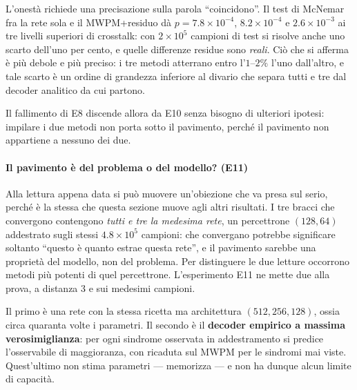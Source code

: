 L'onestà richiede una precisazione sulla parola ``coincidono''. Il test di McNemar fra la rete sola e il \ac{MWPM}+residuo dà $p = 7.8\times10^{-4}$, $8.2\times10^{-4}$ e $2.6\times10^{-3}$ ai tre livelli superiori di crosstalk: con $2\times10^{5}$ campioni di test si risolve anche uno scarto dell'uno per cento, e quelle differenze residue sono \emph{reali}. Ciò che si afferma è più debole e più preciso: i tre metodi atterrano entro l'$1$--$2\%$ l'uno dall'altro, e tale scarto è un ordine di grandezza inferiore al divario che separa tutti e tre dal decoder analitico da cui partono.

Il fallimento di E8 discende allora da E10 senza bisogno di ulteriori ipotesi: impilare i due metodi non porta sotto il pavimento, perché il pavimento non appartiene a nessuno dei due.

\paragraph{Il pavimento è del problema o del modello? (E11)}
Alla lettura appena data si può muovere un'obiezione che va presa sul serio, perché è la stessa che questa sezione muove agli altri risultati. I tre bracci che convergono contengono \emph{tutti e tre la medesima rete}, un percettrone $(128, 64)$ addestrato sugli stessi $4.8\times10^5$ campioni: che convergano potrebbe significare soltanto ``questo è quanto estrae questa rete'', e il pavimento sarebbe una proprietà del modello, non del problema. Per distinguere le due letture occorrono metodi più potenti di quel percettrone. L'esperimento E11 ne mette due alla prova, a distanza 3 e sui medesimi campioni.

Il primo è una rete con la stessa ricetta ma architettura $(512, 256, 128)$, ossia circa quaranta volte i parametri. Il secondo è il \textbf{decoder empirico a massima verosimiglianza}: per ogni sindrome osservata in addestramento si predice l'osservabile di maggioranza, con ricaduta sul \ac{MWPM} per le sindromi mai viste. Quest'ultimo non stima parametri --- memorizza --- e non ha dunque alcun limite di capacità.

